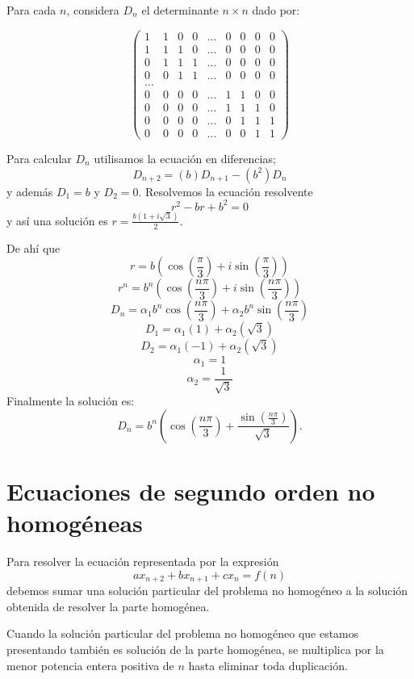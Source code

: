 \documentclass{report}
\begin{document}
Para cada $n$, considera $D_{n}$ el determinante $n\times n$ dado por:

\begin{equation*}
\begin{pmatrix}
1 & 1 & 0 & 0 &\ldots & 0 & 0 & 0 & 0\\
1 & 1 & 1 & 0 &\ldots & 0 & 0 & 0 & 0\\
0 & 1 & 1 & 1 &\ldots & 0 & 0 & 0 & 0\\
0 & 0 & 1 & 1 &\ldots & 0 & 0 & 0 & 0\\
\ldots\\
0 & 0 & 0 & 0 &\ldots & 1 & 1 & 0 & 0\\
0 & 0 & 0 & 0 &\ldots & 1 & 1 & 1 & 0\\
0 & 0 & 0 & 0 &\ldots & 0 & 1 & 1 & 1\\
0 & 0 & 0 & 0 &\ldots & 0 & 0 & 1 & 1
\end{pmatrix}
\end{equation*}


Para calcular $D_{n}$ utilisamos la ecuación en diferencias;
\begin{equation}
  \label{determinante}
D_{n+2}=(b)D_{n+1}-(b^2)D_{n}
\end{equation}
 y además $D_{1}=b$ y $D_{2}=0$.
Resolvemos la ecuación resolvente $$r^{2}-br+b^2=0$$ y así una solución es $r=\frac{b(1+i \sqrt{3})}{2}$.

De ahí que
  $$r=b(\cos(\frac{\pi}{3})+i\sin(\frac{\pi}{3}))$$
  $$r^n=b^n(\cos(\frac{n\pi}{3})+i\sin(\frac{n\pi}{3}))$$
  $$D_{n}=\alpha_{1}b^n\cos(\frac{n\pi}{3})+\alpha_{2}b^n\sin(\frac{n\pi}{3})$$
  $$D_{1}=\alpha_{1}(1)+\alpha_{2}(\sqrt{3})$$
  $$D_{2}=\alpha_{1}(-1)+\alpha_{2}(\sqrt{3})$$
  $$\alpha_{1}=1$$
  $$\alpha_{2}=\frac{1}{\sqrt{3}}$$
Finalmente la solución es:
\begin{equation}
  \label{solucion determinante}
D_{n}=b^n(\cos(\frac{n\pi}{3})+\frac{\sin(\frac{n\pi}{3})}{\sqrt{3}}).
\end{equation}


\section{Ecuaciones de segundo orden no homogéneas}
\label{sec:nohomogeneas}

Para resolver la ecuación representada por la expresión
$$ax_{n+2}+bx_{n+1}+cx_{n}=f(n)$$ debemos sumar una solución particular
del problema no homogéneo a la solución obtenida de resolver la parte
homogénea.

Cuando la solución particular del problema no homogéneo que estamos
presentando también es solución de la parte homogénea, se multiplica
por la menor potencia entera positiva de $n$ hasta eliminar toda
duplicación.
\end{document}
